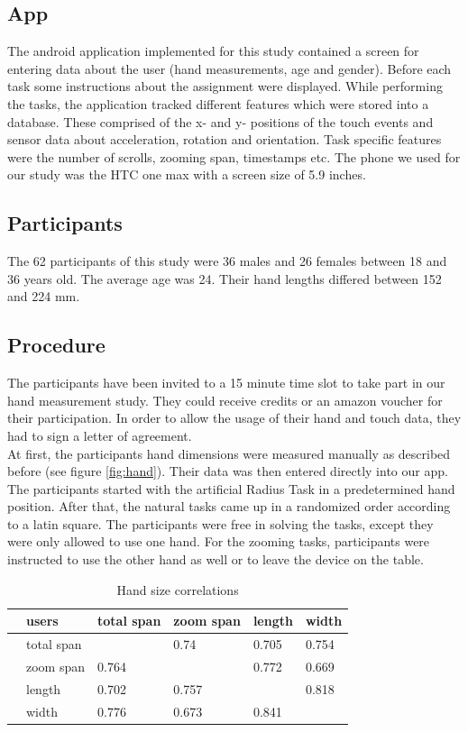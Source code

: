\documentclass{sigchi}
\begin{document}
\subsection{App}
The android application implemented for this study contained a screen for entering data about the user (hand measurements, age and gender). Before each task some instructions about the assignment were displayed. While performing the tasks, the application tracked different features which were stored into a database. These comprised of the x- and y- positions of the touch events and sensor data about acceleration, rotation and orientation. Task specific features were the number of scrolls, zooming span, timestamps etc. The phone we used for our study was the HTC one max with a screen size of 5.9 inches.

\subsection{Participants}
The 62 participants of this study were 36 males and 26 females between 18 and 36 years old. The average age was 24. Their hand lengths differed between 152 and 224 mm.

\subsection{Procedure}
The participants have been invited to a 15 minute time slot to take part in our hand measurement study. They could receive credits or an amazon voucher for their participation. In order to allow the usage of their hand and touch data, they had to sign a letter of agreement.\\
At first, the participants hand dimensions were measured manually as described before (see figure \ref{fig:hand}). Their data was then entered directly into our app. The participants started with the artificial Radius Task in a predetermined hand position. After that, the natural tasks came up in a randomized order according to a latin square. The participants were free in solving the tasks, except they were only allowed to use one hand. For the zooming tasks, participants were instructed to use the other hand as well or to leave the device on the table.

\begin{table}[ht]
\centering
\caption{Hand size correlations}
\label{handSizeCorrelations}
\begin{tabular}{ll|llll}
 &users  &total span  &zoom span  &length  &width  \\ \hline
 &total span  &  &0.74  &0.705  &0.754 \\
 &zoom span  &0.764  &  &0.772  &0.669 \\
 &length  &0.702  &0.757  &  &0.818 \\
 &width  &0.776  &0.673  &0.841  &
\end{tabular}
\end{table}
\end{document}

